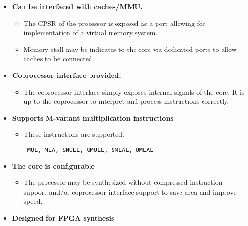 \documentclass[11pt]{article}
\begin{document}
\begin{itemize}
\item \textbf{Can be interfaced with caches/MMU.}

        \begin{itemize}

        \item The CPSR of the processor is exposed as a port allowing for 
        implementation of a virtual memory system. 

        \item Memory stall may be indicates to the core via dedicated ports to 
        allow caches to be connected.

        \end{itemize}

\item \textbf{Coprocessor interface provided.}

        \begin{itemize}

        \item The coprocessor interface simply exposes internal signals of the 
        core. It is up to the coprocessor to interpret and process instructions 
        correctly.

        \end{itemize}

\item \textbf{Supports M-variant multiplication instructions}

        \begin{itemize}

        \item These instructions are supported: 

        \texttt
        {
                MUL, MLA, 
                SMULL, UMULL,
                SMLAL, UMLAL
        }

        \end{itemize}

\item \textbf{The core is configurable}

\begin{itemize}

        \item The processor may be synthesized without compressed instruction 
        support and/or coprocessor interface support to save area and improve
        speed.

\end{itemize}

\item \textbf{Designed for FPGA synthesis}


\end{itemize}
\end{document}
